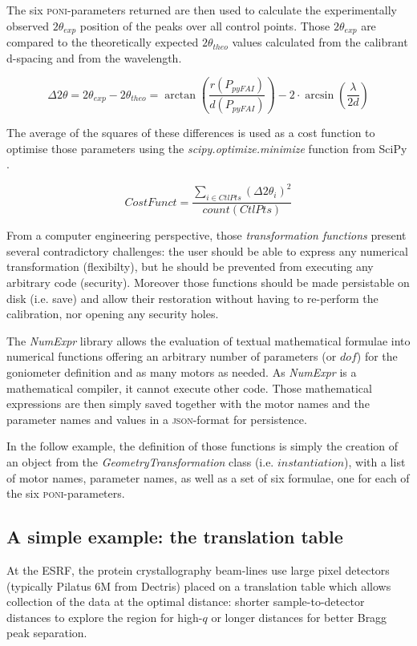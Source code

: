 \documentclass[preprint]{iucr}              %
\begin{document}
The six \textsc{poni}-parameters returned 
are then used to
calculate the experimentally observed $2\theta_{exp}$ position of the peaks over all control
points.
Those $2\theta_{exp}$ are compared to
the theoretically expected $2\theta_{theo}$ values calculated from the calibrant d-spacing and
from the wavelength.

$$
\Delta 2\theta = 2\theta _{exp} - 2\theta _{theo} =
\arctan(\frac{r(P_{pyFAI})}{d(P_{pyFAI})}) -  2 \cdot
\arcsin(\frac{\lambda}{2d})
$$


The average of the squares of these differences is used as a cost function
to optimise those parameters using the \textit{scipy.optimize.minimize}
function from SciPy \cite{scipy}.

$$
CostFunct = \frac{ \sum\limits_{i \in CtlPts} {(\Delta 2\theta_i)^2}}
{count(CtlPts)} $$

From a computer engineering perspective, 
those \textit{transformation functions} present several contradictory challenges: 
the user should be able to express any numerical transformation (flexibilty),
but he should be prevented from executing any arbitrary code (security).  
Moreover those functions should be made persistable on disk (i.e. save) and 
allow their restoration without having to re-perform the calibration, nor 
opening any security holes. 

The \textit{NumExpr} library \cite{numexpr} allows the evaluation of 
textual mathematical formulae into numerical
functions offering an arbitrary number of parameters (or $dof$) for 
the goniometer definition and as many motors as needed.
As \textit{NumExpr} is a mathematical compiler, it cannot execute other code. 
Those mathematical expressions are then simply saved together with the motor names 
and the parameter names and values in a \textsc{json}-format for persistence.

In the follow example, the definition of those functions is simply the creation 
of an object from the 
\textit{GeometryTransformation} class (i.e. $instantiation$), with a list of
motor names, parameter names, as well as a set of six formulae, one for each of
the six \textsc{poni}-parameters.

\subsection{A simple example: the translation table}

At the  ESRF, the protein crystallography beam-lines use large pixel detectors
(typically Pilatus 6M from Dectris) placed on a translation table which allows
collection of the data at the optimal distance: shorter sample-to-detector
distances to explore the region for high-$q$ 
or longer distances for better Bragg peak separation. 
\end{document}
